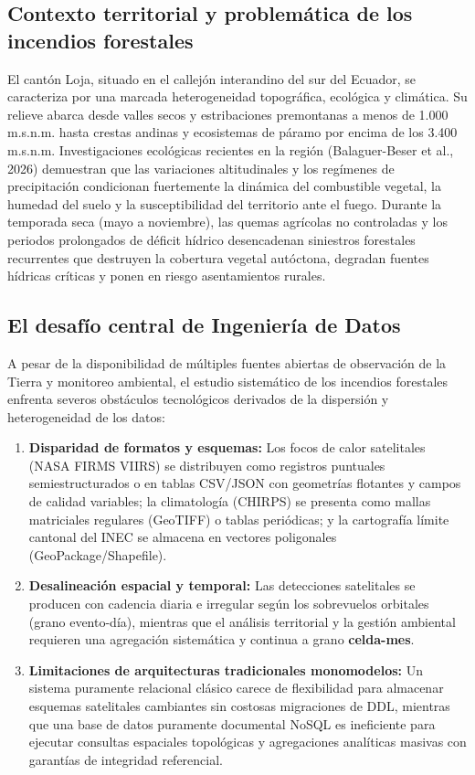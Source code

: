 \documentclass[11pt,a4paper]{article}
\begin{document}
\subsection{Contexto territorial y problem\'atica de los incendios forestales}
El cant\'on Loja, situado en el callej\'on interandino del sur del Ecuador, se caracteriza por una marcada heterogeneidad topogr\'afica, ecol\'ogica y clim\'atica. Su relieve abarca desde valles secos y estribaciones premontanas a menos de 1.000\,m.s.n.m. hasta crestas andinas y ecosistemas de p\'aramo por encima de los 3.400\,m.s.n.m. Investigaciones ecol\'ogicas recientes en la regi\'on (Balaguer-Beser et al., 2026) demuestran que las variaciones altitudinales y los reg\'imenes de precipitaci\'on condicionan fuertemente la din\'amica del combustible vegetal, la humedad del suelo y la susceptibilidad del territorio ante el fuego. Durante la temporada seca (mayo a noviembre), las quemas agr\'icolas no controladas y los periodos prolongados de d\'eficit h\'idrico desencadenan siniestros forestales recurrentes que destruyen la cobertura vegetal aut\'octona, degradan fuentes h\'idricas cr\'iticas y ponen en riesgo asentamientos rurales.

\subsection{El desaf\'io central de Ingenier\'ia de Datos}
A pesar de la disponibilidad de m\'ultiples fuentes abiertas de observaci\'on de la Tierra y monitoreo ambiental, el estudio sistem\'atico de los incendios forestales enfrenta severos obst\'aculos tecnol\'ogicos derivados de la dispersi\'on y heterogeneidad de los datos:
\begin{enumerate}
    \item \textbf{Disparidad de formatos y esquemas:} Los focos de calor satelitales (NASA FIRMS VIIRS) se distribuyen como registros puntuales semiestructurados o en tablas CSV/JSON con geometr\'ias flotantes y campos de calidad variables; la climatolog\'ia (CHIRPS) se presenta como mallas matriciales regulares (GeoTIFF) o tablas peri\'odicas; y la cartograf\'ia l\'imite cantonal del INEC se almacena en vectores poligonales (GeoPackage/Shapefile).
    \item \textbf{Desalineaci\'on espacial y temporal:} Las detecciones satelitales se producen con cadencia diaria e irregular seg\'un los sobrevuelos orbitales (grano evento-d\'ia), mientras que el an\'alisis territorial y la gesti\'on ambiental requieren una agregaci\'on sistem\'atica y continua a grano \textbf{celda-mes}.
    \item \textbf{Limitaciones de arquitecturas tradicionales monomodelos:} Un sistema puramente relacional cl\'asico carece de flexibilidad para almacenar esquemas satelitales cambiantes sin costosas migraciones de DDL, mientras que una base de datos puramente documental NoSQL es ineficiente para ejecutar consultas espaciales topol\'ogicas y agregaciones anal\'iticas masivas con garant\'ias de integridad referencial.
\end{enumerate}
\end{document}
